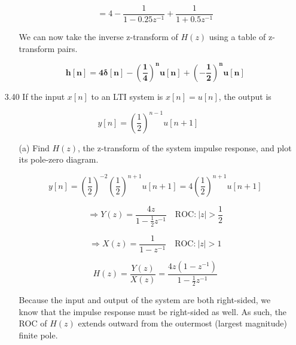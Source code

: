 \documentclass[fleqn]{article}
\makeatletter
\newenvironment{equationCenter}{\@fleqnfalse\begin{equation*}}{\end{equation*}}
\makeatother
\begin{document}
\begin{enumerate}[nolistsep]
\begin{enumerate}[nolistsep]
					\begin{equation*}
						= 4 - \frac{1}{1-0.25z^{-1}} + \frac{1}{1+0.5z^{-1}}
					\end{equation*}
					
					We can now take the inverse z-transform of $H(z)$ using a table of z-transform pairs.
					
					\begin{equation*}
						\mathbf{h[n] = 4\delta[n] - \left(\frac{1}{4}\right)^nu[n] + \left(-\frac{1}{2}\right)^nu[n]}
					\end{equation*}
					
				\end{enumerate}
				
			\item[3.40] If the input $x[n]$ to an LTI system is $x[n] = u[n]$, the output is
				
				\begin{equationCenter}
					y[n] = \left(\frac{1}{2}\right)^{n-1}u[n+1]
				\end{equationCenter}
					
				\begin{enumerate}[nolistsep]
					\item[(a)] Find $H(z)$, the z-transform of the system impulse response, and plot its pole-zero diagram.
					
						\begin{equation*}
							y[n] = \left(\frac{1}{2}\right)^{-2}\left(\frac{1}{2}\right)^{n+1}u[n+1] = 4\left(\frac{1}{2}\right)^{n+1}u[n+1]
						\end{equation*}
						
						\begin{equation*}
							\Rightarrow Y(z) = \frac{4z}{1 - \frac{1}{2}z^{-1}}\quad \text{ROC:}\ |z| > \frac{1}{2}
						\end{equation*}
						
						\begin{equation*}
							\Rightarrow X(z) = \frac{1}{1 - z^{-1}} \quad \text{ROC:}\ |z| > 1
						\end{equation*}
						
						\begin{equation*}
							H(z) = \frac{Y(z)}{X(z)} = \frac{4z(1 - z^{-1})}{1 - \frac{1}{2}z^{-1}}
						\end{equation*}
						
						Because the input and output of the system are both right-sided, we know that the impulse response must be right-sided as well. As such, the ROC of $H(z)$ extends outward from
the outermost (largest magnitude) finite pole.
					

\end{enumerate}
\end{enumerate}
\end{document}
